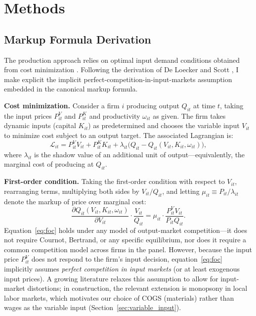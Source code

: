 \documentclass[11pt]{article}
\begin{document}
\appendix
\section{Methods}\label{app:methods}

\subsection{Markup Formula Derivation}\label{app:markup_derivation}

The production approach relies on optimal input demand conditions obtained from cost minimization \cite{DLW2012}. Following the derivation of De Loecker and Scott \cite{DeLoeckerScott2025}, I make explicit the implicit perfect-competition-in-input-markets assumption embedded in the canonical markup formula.

\textbf{Cost minimization.} Consider a firm $i$ producing output $Q_{it}$ at time $t$, taking the input prices $P^V_{it}$ and $P^K_{it}$ and productivity $\omega_{it}$ as given. The firm takes dynamic inputs (capital $K_{it}$) as predetermined and chooses the variable input $V_{it}$ to minimize cost subject to an output target. The associated Lagrangian is:
\begin{equation}\label{eq:lagrangian}
    \mathcal{L}_{it} = P^V_{it} V_{it} + P^K_{it} K_{it} + \lambda_{it}\bigl(Q_{it} - Q_{it}(V_{it}, K_{it}, \omega_{it})\bigr),
\end{equation}
where $\lambda_{it}$ is the shadow value of an additional unit of output---equivalently, the marginal cost of producing at $Q_{it}$.

\textbf{First-order condition.} Taking the first-order condition with respect to $V_{it}$, rearranging terms, multiplying both sides by $V_{it}/Q_{it}$, and letting $\mu_{it} \equiv P_{it}/\lambda_{it}$ denote the markup of price over marginal cost:
\begin{equation}\label{eq:foc}
    \frac{\partial Q_{it}(V_{it}, K_{it}, \omega_{it})}{\partial V_{it}} \cdot \frac{V_{it}}{Q_{it}} = \mu_{it} \cdot \frac{P^V_{it} V_{it}}{P_{it} Q_{it}}.
\end{equation}
Equation~\eqref{eq:foc} holds under any model of output-market competition---it does not require Cournot, Bertrand, or any specific equilibrium, nor does it require a common competition model across firms in the panel. However, because the input price $P^V_{it}$ does not respond to the firm's input decision, equation~\eqref{eq:foc} implicitly assumes \emph{perfect competition in input markets} (or at least exogenous input prices). A growing literature relaxes this assumption to allow for input-market distortions; in construction, the relevant extension is monopsony in local labor markets, which motivates our choice of COGS (materials) rather than wages as the variable input (Section~\ref{sec:variable_input}).
\end{document}
